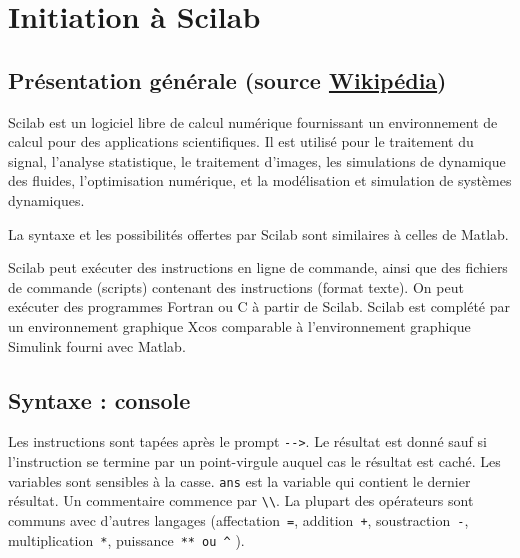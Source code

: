 \chapter{Initiation à Scilab\label{annexe-scilab}}

\section[Présentation générale]{Présentation générale (source \href{https://fr.wikipedia.org/wiki/Scilab}{Wikipédia})}
Scilab est un logiciel libre
de calcul numérique fournissant un environnement de
calcul pour des applications scientifiques. 
Il est utilisé pour le traitement 
du signal, l'analyse statistique, 
le traitement d'images, les simulations de 
dynamique des fluides, l'optimisation numérique, et la 
modélisation et simulation de systèmes dynamiques.

La syntaxe et les possibilités offertes par Scilab sont 
similaires à celles de Matlab.

Scilab peut exécuter des instructions en ligne de commande, ainsi que 
des fichiers de commande (scripts) contenant des instructions (format texte). 
On peut exécuter des programmes Fortran ou C à partir de Scilab.
Scilab est complété par un environnement graphique Xcos comparable 
à l'environnement graphique Simulink fourni avec Matlab. 

\newpage
\section{Syntaxe : console}
Les instructions sont tapées après le prompt \verb?-->?. Le résultat est donné sauf si l'instruction se termine par 
un point-virgule auquel cas le résultat est caché.
Les variables sont sensibles à la casse.
\verb?ans? est la variable qui contient le dernier résultat.
Un commentaire commence par  \verb?\\?. 
La plupart des opérateurs sont communs avec d'autres langages (affectation~\verb?=?, addition~\verb?+?, soustraction~\verb?-?, multiplication~\verb?*?, puissance~\verb?** ou ^? ).

